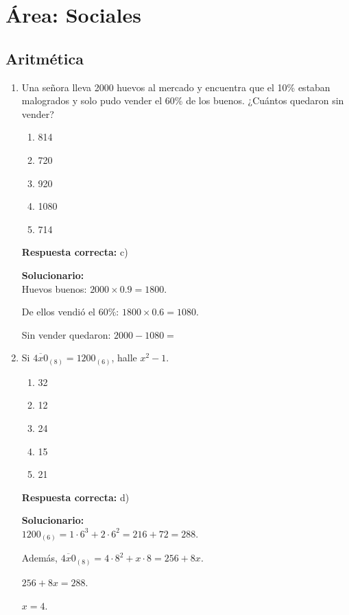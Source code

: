 \section*{Área: Sociales}


\subsection*{Aritmética}

\begin{enumerate}
	\item Una señora lleva 2000 huevos al mercado y encuentra que el 10\% estaban malogrados y solo pudo vender el 60\% de los buenos. ¿Cuántos quedaron sin vender?
	\begin{enumerate}[label=\alph*)]
		\item 814
		\item 720
		\item 920
		\item 1080
		\item 714
	\end{enumerate}
	\textbf{Respuesta correcta:} c)
	
	\vspace{2mm}
	\textbf{Solucionario:}\\
	Huevos buenos: $2000\times 0.9=1800$.
	
	De ellos vendió el $60\%$: $1800\times 0.6=1080$.
	
	Sin vender quedaron: $2000-1080=$
	
	\vspace{6mm}
	
	\item Si $\overline{4x0}_{(8)}=1200_{(6)}$, halle $x^2-1$.
	\begin{enumerate}[label=\alph*)]
		\item 32
		\item 12
		\item 24
		\item 15
		\item 21
	\end{enumerate}
	\textbf{Respuesta correcta:} d)
	
	\vspace{2mm}
	\textbf{Solucionario:}\\
	$1200_{(6)}=1\cdot 6^3+2\cdot 6^2=216+72=288$.
	
	Además, $\overline{4x0}_{(8)}=4\cdot 8^2+x\cdot 8=256+8x$.
	
	$256+8x=288$.
	
	$x=4$.
	

\end{enumerate}
